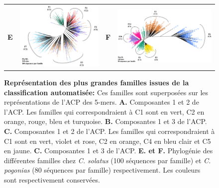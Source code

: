 \documentclass[12pt,a4paper]{article}
\begin{document}
\begin{figure}
\begin{tabular}{cc|cc}
		\textbf{E} & \includegraphics[scale=0.20]{img/tree_solatus.png} & \textbf{F} & \includegraphics[scale=0.20]{img/tree_pogonias.png} \\
	\end{tabular}
	\caption{\textbf{Représentation des plus grandes familles issues de la classification automatisée:} Ces familles sont superposées sur les représentations de l'ACP des 5-mers.
	\textbf{A.} Composantes 1 et 2 de l'ACP. Les familles qui correspondraient à C1 sont en vert, C2 en orange, rouge, bleu et turquoise.  \textbf{B.} Composantes 1 et 3 de l'ACP. 
	\textbf{C.} Composantes 1 et 2 de l'ACP. Les familles qui correspondraient à C1 sont en vert, violet et rose, C2 en orange, C4 en bleu clair et C5 en jaune.
	\textbf{C.} Composantes 1 et 3 de l'ACP.
	\textbf{E. et F.} Phylogénie des différentes familles chez \textit{C. solatus} (100 séquences par famille) et \textit{C. pogonias} (80 séquences par famille) respectivement. Les couleurs sont respectivement conservées.	 
	\label{fig:so_po_acp_tree}
		} 
\end{figure}
			
\end{document}
